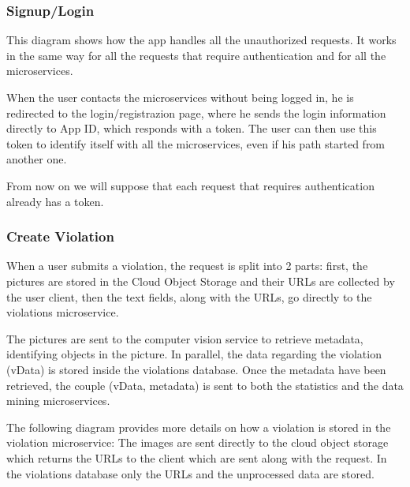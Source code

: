 \subsubsection{Signup/Login}
This diagram shows how the app handles all the unauthorized requests. It works in the same way for all the requests that require authentication and for all the microservices.

When the user contacts the microservices without being logged in, he is redirected to the login/registrazion page, where he sends the login information directly to App ID, which responds with a token. The user can then use this token to identify itself with all the microservices, even if his path started from another one.

From now on we will suppose that each request that requires authentication already has a token.

\subsubsection{Create Violation}
When a user submits a violation, the request is split into 2 parts: first, the pictures are stored in the Cloud Object Storage and their URLs are collected by the user client, then the text fields, along with the URLs, go directly to the violations microservice.

The pictures are sent to the computer vision service to retrieve metadata, identifying objects in the picture. In parallel, the data regarding the violation (vData) is stored inside the violations database. Once the metadata have been retrieved, the couple (vData, metadata) is sent to both the statistics and the data mining microservices.

The following diagram provides more details on how a violation is stored in the violation microservice: The images are sent directly to the cloud object storage which returns the URLs to the client which are sent along with the request. In the violations database only the URLs and the unprocessed data are stored.

